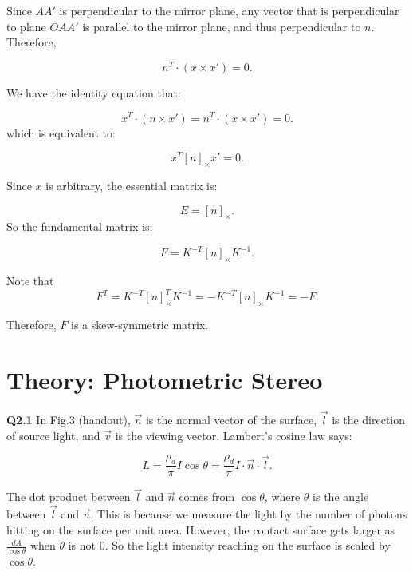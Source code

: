 \documentclass[
  course = {{16-720B Computer Vision}},
  quartile = {{1}},
  assignment = 5\ -\ 3D\ Reconstruction\ \&\ Photometric\ Stereo,
  name = {{Kangle Deng}},
  email = {{kangled@andrew.cmu.edu}},
  firstexercise = 1
]{aga-homework}
\begin{document}
Since $AA'$ is perpendicular to the mirror plane, any vector that is perpendicular to plane $OAA'$ is parallel to the mirror plane, and thus perpendicular to $n$. Therefore,

\begin{equation*}
    n^T \cdot (x \times x') = 0.
\end{equation*}

We have the identity equation that:

\begin{equation*}
    x^T \cdot (n \times x') = n^T \cdot (x \times x') = 0.
\end{equation*}
which is equivalent to:

\begin{equation*}
    x^T[n]_\times x' = 0.
\end{equation*}

Since $x$ is arbitrary, the essential matrix is:

\begin{equation*}
    E = [n]_\times.
\end{equation*}
So the fundamental matrix is:

\begin{equation*}
    F = K^{-T}[n]_\times K^{-1}.
\end{equation*}

Note that
\begin{equation*}
    F^T = K^{-T}[n]_\times^T K^{-1} = -K^{-T}[n]_\times K^{-1} = -F.
\end{equation*}

Therefore, $F$ is a skew-symmetric matrix.

\section{Theory: Photometric Stereo}

\noindent\textbf{Q2.1} In Fig.3 (handout), $\Vec{n}$ is the normal vector of the surface, $\Vec{l}$ is the direction of source light, and $\Vec{v}$ is the viewing vector. Lambert's cosine law says:

\begin{equation*}
    L = \frac{\rho_d}{\pi}I\cos\theta = \frac{\rho_d}{\pi} I \cdot \Vec{n} \cdot \Vec{l}.
\end{equation*}

The dot product between $\Vec{l}$ and $\Vec{n}$ comes from $\cos\theta$, where $\theta$ is the angle between $\Vec{l}$ and $\Vec{n}$. This is because we measure the light by the number of photons hitting on the surface per unit area. However, the contact surface gets larger as $\frac{dA}{\cos\theta}$ when $\theta$ is not 0. So the light intensity reaching on the surface is scaled by $\cos\theta$.
\end{document}
